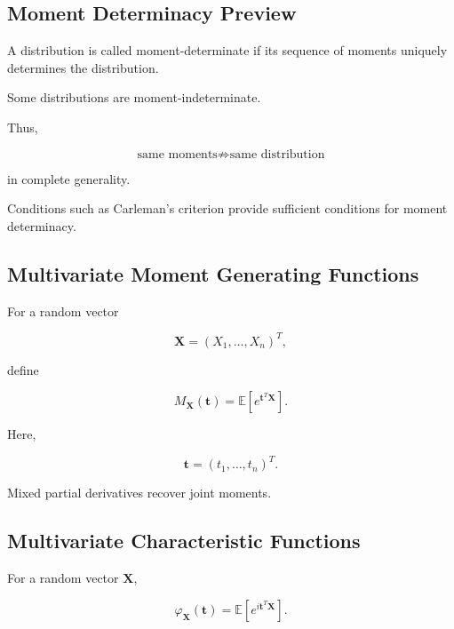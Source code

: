 \subsection{Moment Determinacy Preview}
\label{subsec:moment-determinacy-preview}

A distribution is called moment-determinate if its sequence of moments
uniquely determines the distribution.

Some distributions are moment-indeterminate.

Thus,

\[
\boxed{
\text{same moments}
\not\Longrightarrow
\text{same distribution}
}
\]

in complete generality.

Conditions such as Carleman's criterion provide sufficient conditions
for moment determinacy.

\subsection{Multivariate Moment Generating Functions}
\label{subsec:multivariate-mgf}

For a random vector

\[
\mathbf{X}
=
(X_1,\ldots,X_n)^T,
\]

define

\[
\boxed{
M_{\mathbf{X}}(\mathbf{t})
=
\mathbb{E}
\left[
e^{\mathbf{t}^T\mathbf{X}}
\right].
}
\]

Here,

\[
\mathbf{t}
=
(t_1,\ldots,t_n)^T.
\]

Mixed partial derivatives recover joint moments.

\subsection{Multivariate Characteristic Functions}
\label{subsec:multivariate-characteristic-function}

For a random vector \(\mathbf{X}\),

\[
\boxed{
\varphi_{\mathbf{X}}(\mathbf{t})
=
\mathbb{E}
\left[
e^{i\mathbf{t}^T\mathbf{X}}
\right].
}
\]

